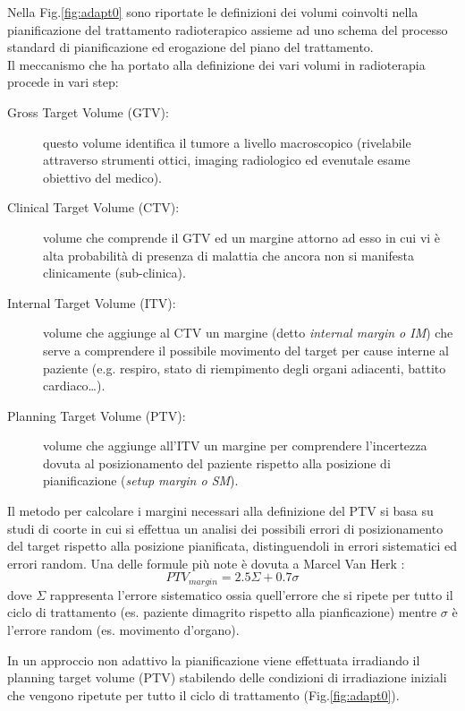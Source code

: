 Nella Fig.\ref{fig:adapt0} sono riportate le definizioni dei volumi coinvolti nella pianificazione del trattamento radioterapico assieme ad uno schema del processo standard di pianificazione ed erogazione del piano del trattamento.\\
Il meccanismo che ha portato alla definizione dei vari volumi in radioterapia procede in vari step:
\begin{description}
\item[Gross Target Volume (GTV):] questo volume identifica il tumore a livello macroscopico (rivelabile attraverso strumenti ottici, imaging radiologico ed evenutale esame obiettivo del medico).

\item[Clinical Target Volume (CTV):] volume che comprende il GTV ed un margine attorno ad esso in cui vi è alta probabilità di presenza di malattia che ancora non si manifesta clinicamente (sub-clinica).

\item[Internal Target Volume (ITV):] volume che aggiunge al CTV un margine (detto \textit{internal margin o IM}) che serve a comprendere il possibile movimento del target per cause interne al paziente (e.g. respiro, stato di riempimento degli organi adiacenti, battito cardiaco\ldots).

\item[Planning Target Volume (PTV):] volume che aggiunge all'ITV un margine per comprendere l'incertezza dovuta al posizionamento del paziente rispetto alla posizione di pianificazione (\textit{setup margin o SM}).
\end{description}

Il metodo per calcolare i margini necessari alla definizione del PTV si basa su studi di coorte in cui si effettua un analisi dei possibili errori di posizionamento del target rispetto alla posizione pianificata, distinguendoli in errori sistematici ed errori random. Una delle formule più note è dovuta a Marcel Van Herk \cite{ICRU62}:
\begin{equation}
PTV_{margin} = 2.5\Sigma + 0.7\sigma
\end{equation}
dove $\Sigma$ rappresenta l'errore sistematico ossia quell'errore che si ripete per tutto il ciclo di trattamento (es. paziente dimagrito rispetto alla pianficazione) mentre $\sigma$ è l'errore random (es. movimento d'organo).

In un approccio non adattivo la pianificazione viene effettuata irradiando il planning target volume (PTV) stabilendo delle condizioni di irradiazione iniziali che vengono ripetute per tutto il ciclo di trattamento (Fig.\ref{fig:adapt0}).

